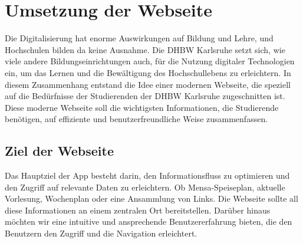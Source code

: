 \chapter{Umsetzung der Webseite}
Die Digitalisierung hat enorme Auswirkungen auf Bildung und Lehre, und Hochschulen bilden da keine Ausnahme. Die DHBW Karlsruhe setzt sich, wie viele andere Bildungseinrichtungen auch, für die Nutzung digitaler Technologien ein, um das Lernen und die Bewältigung des Hochschullebens zu erleichtern. In diesem Zusammenhang entstand die Idee einer modernen Webseite, die speziell auf die Bedürfnisse der Studierenden der DHBW Karlsruhe zugeschnitten ist. Diese moderne Webseite soll die wichtigsten Informationen, die Studierende benötigen, auf effiziente und benutzerfreundliche Weise zusammenfassen.\\
\section{Ziel der Webseite}
Das Hauptziel der App besteht darin, den Informationsfluss zu optimieren und den Zugriff auf relevante Daten zu erleichtern. Ob Mensa-Speiseplan, aktuelle Vorlesung, Wochenplan oder eine Ansammlung von Links. Die Webseite sollte all diese Informationen an einem  zentralen Ort bereitstellen. Darüber hinaus möchten wir eine intuitive und ansprechende Benutzererfahrung bieten, die den Benutzern den Zugriff und die Navigation erleichtert.\\

